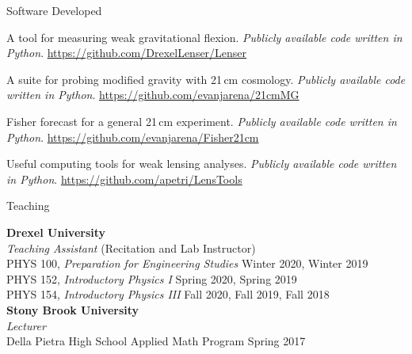 \documentclass{resume} %
\newcommand{\forceindent}{\leavevmode{\parindent=1em\indent}}
\begin{document}
\begin{rSection}{Software Developed}

\underline{}

\begin{description}[leftmargin=10em, style=nextline]

\item[\texttt{Lenser}] A tool for measuring weak gravitational flexion. \textit{Publicly available code written in Python}. \href{https://github.com/DrexelLenser/Lenser}{https://github.com/DrexelLenser/Lenser}

\item[21cmMG] A suite for probing modified gravity with 21\,cm cosmology. \textit{Publicly available code written in Python}. \href{https://github.com/evanjarena/21cmMG}{https://github.com/evanjarena/21cmMG}

\item[Fisher21cm] Fisher forecast for a general 21\,cm experiment. \textit{Publicly available code written in Python}. \href{https://github.com/evanjarena/Fisher21cm}{https://github.com/evanjarena/Fisher21cm}

\end{description}

\underline{}

\begin{description}[leftmargin=10em, style=nextline]

\item[\texttt{LensTools}] Useful computing tools for weak lensing analyses. \textit{Publicly available code written in Python}. \href{https://github.com/apetri/LensTools}{https://github.com/apetri/LensTools}

\end{description}

\end{rSection}


\begin{rSection}{Teaching}

\textbf{Drexel University} \\ 
\textit{Teaching Assistant} (Recitation and Lab Instructor)\\
\forceindent PHYS 100, \textit{Preparation for Engineering Studies}  \hfill {Winter 2020, Winter 2019}\\
\forceindent PHYS 152, \textit{Introductory Physics I}  \hfill {Spring 2020, Spring 2019}\\
\forceindent PHYS 154, \textit{Introductory Physics III}  \hfill {Fall 2020, Fall 2019, Fall 2018}\\
\textbf{Stony Brook University} \\
\textit{Lecturer}\\
\forceindent  Della Pietra High School Applied Math Program \hfill {Spring 2017}

\end{rSection}
\end{document}
